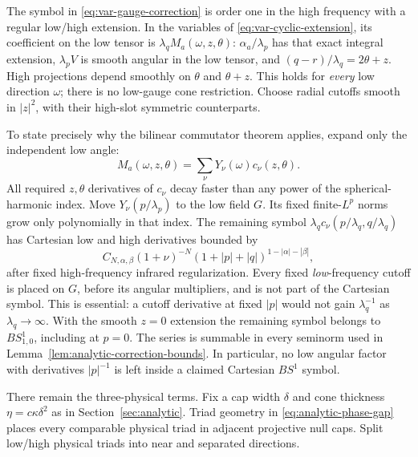 \documentclass[11pt,a4paper]{article}
\numberwithin{equation}{section}
\theoremstyle{definition}
\begin{document}
The symbol in \eqref{eq:var-gauge-correction} is order one in the high
frequency with a regular
low/high extension. In the variables of
\eqref{eq:var-cyclic-extension}, its coefficient on the low tensor is
$\lambda_q M_a(\omega,z,\theta)$: $\alpha_a/\lambda_p$ has that exact integral
extension, $\lambda_p V$ is smooth angular in the low tensor, and
$(q-r)/\lambda_q=2\theta+z$. High projections depend smoothly on $\theta$ and
$\theta+z$. This holds for \emph{every} low direction $\omega$;
there is no low-gauge cone restriction. Choose radial cutoffs smooth
in $|z|^2$, with their high-slot symmetric counterparts.

To state precisely why the bilinear commutator theorem applies, expand
only the independent low angle:
\begin{equation*}
M_a(\omega,z,\theta)
=\sum_\nu Y_\nu(\omega)c_\nu(z,\theta).
\end{equation*}
All required $z,\theta$ derivatives of $c_\nu$ decay faster than any
power of the spherical-harmonic index. Move $Y_\nu(p/\lambda_p)$ to the low
field $G$. Its fixed finite-$L^p$ norms grow only polynomially in that
index. The remaining symbol $\lambda_q c_\nu(p/\lambda_q,q/\lambda_q)$ has Cartesian low and
high derivatives bounded by
\begin{equation*}
C_{N,\alpha,\beta}(1+\nu)^{-N}
(1+|p|+|q|)^{1-|\alpha|-|\beta|},
\end{equation*}
after fixed high-frequency infrared regularization. Every fixed
\emph{low}-frequency cutoff is placed on $G$, before its angular
multipliers, and is not part of the Cartesian symbol. This is essential:
a cutoff derivative at fixed $|p|$ would not gain $\lambda_q^{-1}$ as
$\lambda_q\to\infty$. With the smooth $z=0$ extension the remaining symbol
belongs to $BS^1_{1,0}$, including at $p=0$. The series is summable in every seminorm used in
Lemma~\ref{lem:analytic-correction-bounds}. In particular, no low angular
factor with derivatives $|p|^{-1}$ is left inside a claimed Cartesian
$BS^1$ symbol.

There remain the three-physical terms. Fix a cap width $\delta$ and
cone thickness $\eta=c\kappa\delta^2$ as in Section~\ref{sec:analytic}.
Triad geometry in \eqref{eq:analytic-phase-gap} places every comparable
physical triad in adjacent projective null caps. Split low/high
physical triads into near and separated directions.
\end{document}
